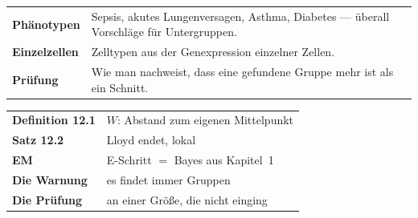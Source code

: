 \begin{forschung}
\begin{center}
{\small
\renewcommand{\arraystretch}{1.45}
\begin{tabular}{@{}P{2.8cm}P{5.4cm}@{}}
\toprule
\textbf{Phänotypen} & Sepsis, akutes Lungenversagen, Asthma, Diabetes --- überall Vorschläge für Untergruppen.\\
\textbf{Einzelzellen} & Zelltypen aus der Genexpression einzelner Zellen.\\
\textbf{Prüfung} & Wie man nachweist, dass eine gefundene Gruppe mehr ist als ein Schnitt.\\
\bottomrule
\end{tabular}}
\end{center}

\begin{center}
\begin{minipage}{0.88\textwidth}
\end{minipage}
\end{center}
\end{forschung}

\begin{merksatz}
\begin{center}
\renewcommand{\arraystretch}{1.5}
\begin{tabular}{@{}P{3.0cm}P{5.6cm}@{}}
\toprule
\textbf{Definition 12.1} & $W$: Abstand zum eigenen Mittelpunkt\\
\textbf{Satz 12.2} & Lloyd endet, lokal\\
\textbf{EM} & E-Schritt $=$ Bayes aus Kapitel~1\\
\textbf{Die Warnung} & es findet immer Gruppen\\
\textbf{Die Prüfung} & an einer Größe, die nicht einging\\
\bottomrule
\end{tabular}
\end{center}

\begin{center}
\begin{minipage}{0.88\textwidth}
\end{minipage}
\end{center}
\end{merksatz}
